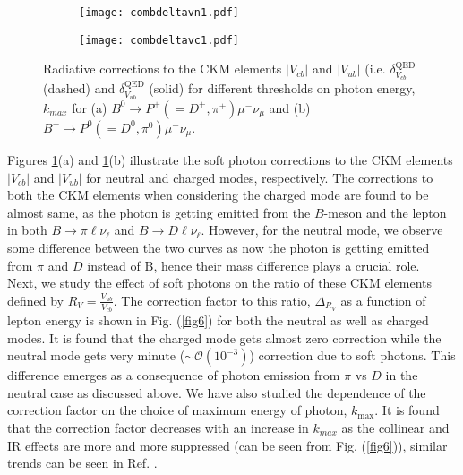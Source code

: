 \documentclass[a4paper,11pt]{article}
\begin{document}
	  \begin{figure}[h]
	 	\begin{subfigure}{.5\textwidth}
	 		\centering
	 		\texttt{[image: combdeltavn1.pdf]}
	 		\caption{}
	 	\end{subfigure}%
	 	\begin{subfigure}{.5\textwidth}
	 		\centering
	 		\texttt{[image: combdeltavc1.pdf]}
	 		\caption{}
	 	\end{subfigure}
	 	\caption{Radiative corrections to the CKM elements $|V_{cb}|$ and $|V_{ub}|$ (i.e. $\delta^{\text{QED}}_{V_{cb}}$ (dashed) and $\delta^{\text{QED}}_{V_{ub}}$ (solid) for different  thresholds on photon energy, $k_{max}$ for (a) $B^0 \rightarrow P^+(=D^+,\pi^+) \mu^- \nu_\mu$ and (b) $B^- \rightarrow P^0(=D^0,\pi^0) \mu^- \nu_\mu$.}
	 	\label{fig5}
	 \end{figure} 
	 Figures \ref{fig5}(a) and \ref{fig5}(b) illustrate the soft photon corrections to the CKM elements $|V_{cb}|$ and $|V_{ub}|$ for neutral and charged modes, respectively. The corrections to both the CKM elements when considering the charged mode are found to be almost same, as the photon is getting emitted from the $B$-meson and the lepton in both $B\rightarrow \pi \ell \nu_\ell$ and $B \rightarrow D \ell \nu_\ell$. However, for the neutral mode, we observe some difference between the two curves as now the photon is getting emitted from $\pi$ and $D$ instead of B, hence their mass difference plays a crucial role.\\
	 Next, we study the effect of soft photons on the ratio of these CKM elements defined by $R_{V} = \frac{V_{ub}}{V_{cb}}$. 
	 The correction factor to this ratio, $\Delta_{R_{V}}$ as a function of lepton energy is shown in Fig. (\ref{fig6}) for both the 
	 neutral as well as charged modes. It is found that the charged mode gets almost zero correction while the neutral mode gets	very minute ($\sim\mathcal{O}(10^{-3})$) correction due to soft photons. This difference emerges as a consequence of photon emission from $\pi$ vs $D$ in the neutral case as discussed above. We have also studied the dependence of the correction factor on the choice of maximum energy of photon, $k_{\text{max}}$. It is found that the correction factor decreases with an increase in $k_{max}$ as the collinear and IR effects are more and more suppressed (can be seen from Fig. (\ref{fig6})), similar trends can be seen in Ref. \cite{deBoer:2018ipi}.
\end{document}
